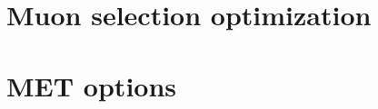 \documentclass{cmspaper}
\begin{document}
  \section{Muon selection optimization}
     \label{app:mus}
%     
  \section{MET options}
     \label{app:met}
%     

\end{document}
